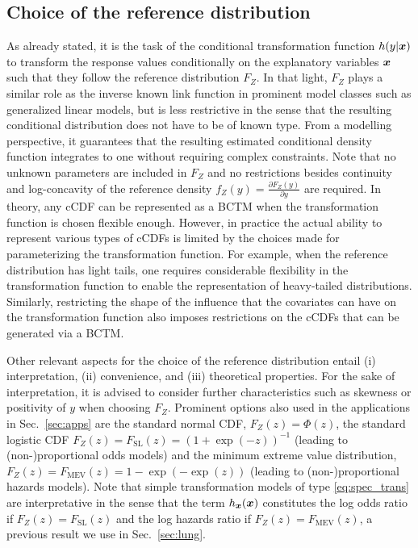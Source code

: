 \documentclass[12pt]{article}
\theoremstyle{plain}
\begin{document}
\subsection{Choice of the reference distribution}\label{sec:reference}
As already stated, it is the task of the conditional transformation function $h(y|\text{\boldmath$x$})$ to transform the response values conditionally on the explanatory variables $\text{\boldmath$x$}$ such that they follow the reference distribution $F_Z$. In that light, $F_Z$ plays a similar role as the inverse known link function in prominent model classes such as generalized linear models, but is less restrictive in the sense that the resulting conditional distribution does not have to be of known type. From a modelling perspective, it guarantees that the resulting estimated conditional density function integrates to one without requiring complex constraints. Note that no unknown parameters are included in $F_Z$ and no restrictions besides continuity and log-concavity of the reference density $f_Z(y) = \frac{\partial F_Z(y)}{\partial y}$ are required. In theory, any cCDF can be represented as a BCTM when the transformation function is chosen flexible enough. However, in practice the actual ability to represent various types of cCDFs is limited by the choices made for parameterizing the transformation function. For example, when the reference distribution has light tails, one requires considerable flexibility in the transformation function to enable the representation of heavy-tailed distributions. Similarly, restricting the shape of the influence that the covariates can have on the transformation function also imposes restrictions on the cCDFs that can be generated via a BCTM.

Other relevant aspects for the choice of the reference distribution entail (i) interpretation, (ii) convenience, and (iii) theoretical properties. For the sake of interpretation, it is advised to consider further characteristics such as skewness or positivity of $y$ when choosing $F_Z$. Prominent options also used in the applications in Sec.~\ref{sec:apps} are the standard normal CDF, $F_Z(z)=\Phi(z)$, the standard logistic CDF $F_Z(z)=F_{\text{SL}}(z)=(1+\exp(-z))^{-1}$ (leading to (non-)proportional odds models) and the minimum extreme value distribution, $F_Z(z)=F_{\text{MEV}}(z)=1-\exp(-\exp(z))$ (leading to (non-)proportional hazards models). Note that  simple transformation models of type \eqref{eq:spec_trans} are interpretative in the sense that the term $h_{\text{\boldmath$x$}}(\text{\boldmath$x$})$ constitutes the log odds ratio if $F_Z(z)=F_\text{SL}(z)$ and the log hazards ratio if $F_Z(z)=F_\text{MEV}(z)$, a previous result we use in Sec.~\ref{sec:lung}.
\end{document}
